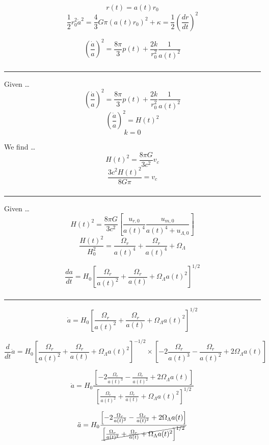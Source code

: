 \documentclass{article}
\begin{document}
\[r(t)= a(t)r_0\]
\[\frac{1}{2}r^2_0 \dot{a}^2 = \frac{4}{3} G\pi (a(t)r_0)^2 + \kappa =\frac{1}{2} \left(\frac{dr}{dt}\right)^2\]

\[\boxed{\left(\frac{\dot{a}}{a}\right)^2 = \frac{8\pi}{3}p(t) + \frac{2k}{r^2_0} \frac{1}{a(t)^2}}\]


\subsubsection{}
\hrule
\vspace{.5cm}
Given \dots 
\[\left(\frac{\dot{a}}{a}\right)^2 = \frac{8\pi}{3}p(t) + \frac{2k}{r^2_0} \frac{1}{a(t)^2}\]
\[\left(\frac{\dot{a}}{a}\right)^2 = H(t)^2\]
\[k = 0\]

We find \dots 
\[H(t)^2 = \frac{8\pi G}{3c^2} v_c\]
\[\boxed{\frac{3c^2H(t)^2}{8G\pi} = v_c}\]

\subsubsection{}
\hrule
\vspace{.5cm}
Given \dots
\[H(t)^2 = \frac{8 \pi G}{3c^2} \left[\frac{u_{r,0}}{a(t)^4} \frac{u_{m, 0}}{a(t)^4 + u_{\Lambda, 0}}\right]\]
\[\frac{H(t)^2}{H_0^2} = \frac{\Omega_r}{a(t)^4} + \frac{\Omega_r}{a(t)^4} + \Omega_\Lambda\]

\[\frac{da}{dt} = H_0 \left[\frac{\Omega_r}{a(t)^2} + \frac{\Omega_r}{a(t)} + \Omega_\Lambda a(t)^2 \right]^{1/2}\]

\subsubsection{}
\hrule
\vspace{.5cm}
\[\dot{a} = H_0 \left[\frac{\Omega_r}{a(t)^2} + \frac{\Omega_r}{a(t)} + \Omega_\Lambda a(t)^2 \right]^{1/2}\]

\[\frac{d}{dt} \dot{a} = H_0 \left[\frac{\Omega_r}{a(t)^2} + \frac{\Omega_r}{a(t)} + \Omega_\Lambda a(t)^2 \right]^{-1/2} \times \left[-2\frac{\Omega_r}{a(t)^3} - \frac{\Omega_r}{a(t)^2} + 2\Omega_\Lambda a(t) \right]\]

\[\ddot{a} = H_0 \frac{\left[-2\frac{\Omega_r}{a(t)^3} - \frac{\Omega_r}{a(t)^2} + 2\Omega_\Lambda a(t) \right]}{\left[\frac{\Omega_r}{a(t)^2} + \frac{\Omega_r}{a(t)} + \Omega_\Lambda a(t)^2 \right]^{1/2}}\]

\[\ddot{a} = H_0 \frac{\left[-2\frac{\Omega_r}{a(t)^3} - \frac{\Omega_r}{a(t)^2} + 2\Omega_\Lambda a(t) \right]}{\cancel{\left[\frac{\Omega_r}{a(t)^2} + \frac{\Omega_r}{a(t)} + \Omega_\Lambda a(t)^2 \right]^{1/2}}}\]
\end{document}
